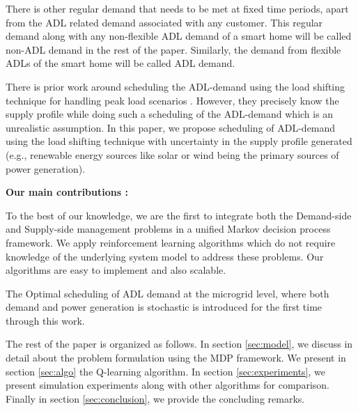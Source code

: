 There is other regular demand that needs to be met at fixed time periods, apart from the ADL related demand associated with any customer. This regular demand along with any non-flexible ADL demand of a smart home will be called non-ADL demand in the rest of the paper. Similarly, the demand from flexible ADLs of the smart home will be called ADL demand.

There is prior work around scheduling the ADL-demand using the load shifting technique for handling  peak load scenarios \cite{CL2014}. However, they precisely know the supply profile while doing such a scheduling of the ADL-demand which is an unrealistic assumption. In this paper, we propose scheduling of ADL-demand using the load shifting technique with uncertainty in the supply profile generated (e.g., renewable energy sources like solar or wind being the primary sources of power generation).


\textbf{Our main contributions :}\\
\begin{inparaenum}[\bfseries (i)]
\item To the best of our knowledge, we are the first  to integrate both the Demand-side and Supply-side management problems  in a unified Markov decision process framework. We apply reinforcement learning algorithms which do not require knowledge of the underlying system model to address these problems. Our algorithms are easy to implement and also scalable.\\
\item The Optimal scheduling of ADL demand at the microgrid level, where both  demand and power generation is stochastic is  introduced for the first time through this work. \\    
\end{inparaenum}

The rest of the paper is organized as follows. In section \ref{sec:model}, we discuss in detail about the problem formulation using the MDP framework. We present  in section \ref{sec:algo} the Q-learning algorithm. In section \ref{sec:experiments}, we present simulation experiments along with other algorithms for comparison. Finally in section \ref{sec:conclusion}, we provide the concluding remarks.